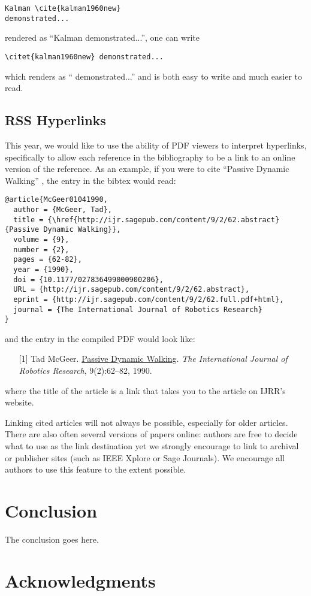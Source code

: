 \documentclass[conference]{IEEEtran}
\begin{document}
{\small
\begin{verbatim}
Kalman \cite{kalman1960new} 
demonstrated...
\end{verbatim}
}

\noindent
rendered as 
``Kalman \cite{kalman1960new} demonstrated...'', 
one can
write 

{\small
\begin{verbatim}
\citet{kalman1960new} demonstrated... 
\end{verbatim}
}
\noindent
which renders as ``\citet{kalman1960new} demonstrated...'' and is 
both easy to write and much easier to read.
  
\subsection{RSS Hyperlinks}

This year, we would like to use the ability of PDF viewers to interpret
hyperlinks, specifically to allow each reference in the bibliography to be a
link to an online version of the reference. 
As an example, if you were to cite ``Passive Dynamic Walking''
\cite{McGeer01041990}, the entry in the bibtex would read:

{\small
\begin{verbatim}
@article{McGeer01041990,
  author = {McGeer, Tad}, 
  title = {\href{http://ijr.sagepub.com/content/9/2/62.abstract}{Passive Dynamic Walking}}, 
  volume = {9}, 
  number = {2}, 
  pages = {62-82}, 
  year = {1990}, 
  doi = {10.1177/027836499000900206}, 
  URL = {http://ijr.sagepub.com/content/9/2/62.abstract}, 
  eprint = {http://ijr.sagepub.com/content/9/2/62.full.pdf+html}, 
  journal = {The International Journal of Robotics Research}
}
\end{verbatim}
}
\noindent
and the entry in the compiled PDF would look like:

\def\tmplabel#1{[#1]}

\begin{enumerate}
\item[\tmplabel{1}] Tad McGeer. \href{http://ijr.sagepub.com/content/9/2/62.abstract}{Passive Dynamic
Walking}. {\em The International Journal of Robotics Research}, 9(2):62--82,
1990.
\end{enumerate}
%
where the title of the article is a link that takes you to the article on IJRR's website. 


Linking cited articles will not always be possible, especially for
older articles. There are also often several versions of papers
online: authors are free to decide what to use as the link destination
yet we strongly encourage to link to archival or publisher sites
(such as IEEE Xplore or Sage Journals).  We encourage all authors to use this feature to
the extent possible.

\section{Conclusion} 
\label{sec:conclusion}

The conclusion goes here.

\section*{Acknowledgments}




\end{document}
